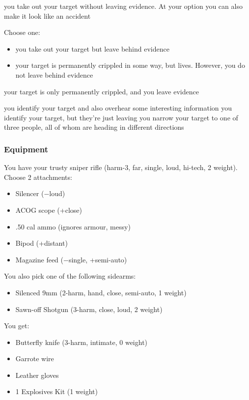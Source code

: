 {you take out your target without leaving evidence. At your option you can also make it look like an accident}
{Choose one:
\begin{itemize}
\item you take out your target but leave behind evidence
\item your target is permanently crippled in some way, but lives. However, you do not leave behind evidence
\end{itemize}}
{your target is only permanently crippled, and you leave evidence}

{you identify your target and also overhear some interesting information}
{you identify your target, but they're just leaving}
{you narrow your target to one of three people, all of whom are heading in different directions}


\subsubsection{Equipment}

You have your trusty sniper rifle (harm-3, far, single, loud, hi-tech, 2 weight). Choose 2 attachments:
\begin{itemize}
\item Silencer ($-$loud)
\item ACOG scope (+close)
\item .50 cal ammo (ignores armour, messy)
\item Bipod (+distant)
\item Magazine feed ($-$single, +semi-auto)
\end{itemize}

You also pick one of the following sidearms:
\begin{itemize}
\item Silenced 9mm (2-harm, hand, close, semi-auto, 1 weight)
\item Sawn-off Shotgun (3-harm, close, loud, 2 weight)
\end{itemize}

You get:
\begin{itemize}
\item Butterfly knife (3-harm, intimate, 0 weight)
\item Garrote wire
\item Leather gloves
\item 1 Explosives Kit (1 weight)
\end{itemize}

